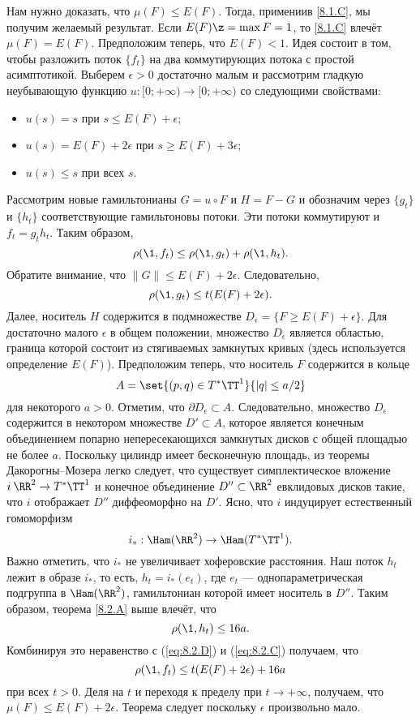 Нам нужно доказать, что $\mu (F) \le E (F)$.
Тогда, примениив \ref{8.1.C}, мы получим желаемый результат.
Если $E (F) \z= \max F = 1$, то \ref{8.1.C} влечёт $\mu (F) = E (F)$.
Предположим теперь, что $E (F) <1$.
Идея состоит в том, чтобы разложить поток $\{f_t\}$ на два
коммутирующих потока с простой асимптотикой. 
Выберем $\epsilon> 0$ достаточно малым и рассмотрим гладкую
неубывающую функцию $u: [0; + \infty) \to [0; + \infty)$ со следующими
    свойствами:  
\begin{itemize}
\item $u (s) = s$ при $s \le E (F) + \epsilon$;
\item $u (s) = E (F) + 2\epsilon$ при $s \ge E (F) + 3\epsilon$;
\item $u (s) \le s$ при всех $s$.
\end{itemize}
Рассмотрим новые гамильтонианы $G = u \circ F$ и $H = F - G$ и
обозначим через $\{g_t\}$ и $\{h_t\}$ соответствующие гамильтоновы
потоки. 
Эти потоки коммутируют и $f_t = g_t h_t$. 
Таким образом, 
\begin{equation}\rho (\1, f_t) \le \rho (\1, g_t) + \rho (\1, h_t).
\label{eq:8.2.C}
\end{equation}
Обратите внимание, что $\| G \| \le E (F) + 2\epsilon$.
Следовательно, 
\begin{equation}
 \rho (\1, g_t) \le t (E (F) + 2\epsilon).
\label{eq:8.2.D}
\end{equation}
Далее, носитель $H$ содержится в подмножестве $D_\epsilon = \{F \ge E
(F) + \epsilon\}$. 
Для достаточно малого $\epsilon$ в общем положении, множество
$D_\epsilon$ является областью, граница которой состоит из стягиваемых
замкнутых кривых (здесь используется определение $E(F)$). 
Предположим теперь, что носитель $F$ содержится в кольце 
\[A = \set{(p, q) \in T^\ast\TT^1}{| q | \le a / 2}\]
для некоторого $a> 0$. 
Отметим, что $\partial D_\epsilon \subset A$.
Следовательно, множество $D_\epsilon$ содержится в некотором множестве
$D' \subset A$, которое является конечным объединением попарно
непересекающихся замкнутых дисков с общей площадью не более $a$. 
Поскольку цилиндр имеет бесконечную площадь, из теоремы
Дакорогны--Мозера \cite[1.6]{HZ} легко следует, что существует
симплектическое вложение $i\: \RR^2 \to T^\ast \TT^1$ и конечное
объединение $D'' \subset \RR^2$ евклидовых дисков такие, что $i$
отображает $D''$ диффеоморфно на $D'$. 
Ясно, что $i$ индуцирует естественный гомоморфизм 
\[i_\ast: \Ham (\RR^2) \to \Ham (T^\ast \TT^1).\]
Важно отметить, что $i_\ast$ не увеличивает хоферовские расстояния.
Наш поток $h_t$ лежит в образе $i_\ast$, то есть, $h_t = i_\ast (e_{t})$,
где $e_{t}$ --- однопараметрическая подгруппа в $\Ham (\RR^2)$,
гамильтониан которой имеет носитель в $D''$. 
Таким образом, теорема \ref{8.2.A} выше влечёт, что 
\[
\rho (\1, h_t) \le 16a.
\]
Комбинируя это неравенство с (\ref{eq:8.2.D}) и (\ref{eq:8.2.C}) получаем, что
\begin{equation}
  \rho (\1, f_t) \le t (E (F) + 2\epsilon) + 16a 
  \label{eq:8.2.E} 
\end{equation}
при всех $t> 0$.
Деля на $t$ и переходя к пределу при $t \to + \infty$, получаем, что
$\mu (F) \le E (F) + 2\epsilon$. 
Теорема следует поскольку $\epsilon$ произвольно мало.
\qeds

